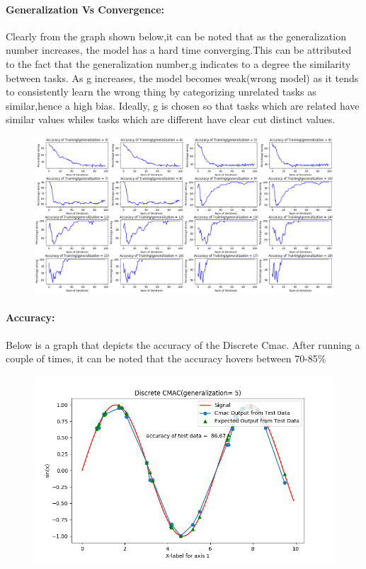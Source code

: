 \documentclass{article}
\begin{document}
  \paragraph{Generalization Vs Convergence:}
   Clearly from the graph shown below,it can be noted that  
  as the generalization number increases, the model has a hard time converging.This can
  be attributed to the fact that the generalization number,g indicates to a degree the similarity
  between tasks. As g increases, the model becomes weak(wrong model) as it tends to consistently learn the wrong thing by categorizing unrelated tasks 
  as similar,hence a high bias. Ideally, g is chosen so that tasks which are related have similar values whiles tasks
  which are different have clear cut distinct values. 
  \begin{figure}[h!]
     \centering
    \includegraphics[scale=0.35]{./Results/convergenceVsgeneralization.png}
  \end{figure}

  \paragraph{Accuracy:}
    Below is a graph that depicts the accuracy of the Discrete Cmac. After running a couple of times, it can 
    be noted that the accuracy hovers between 70-85\%
  \begin{figure}[h!]
    \centering
    \includegraphics[scale=0.7]{./Results/discreteAccuracy.png}
  \end{figure}
\newpage 
\end{document}

